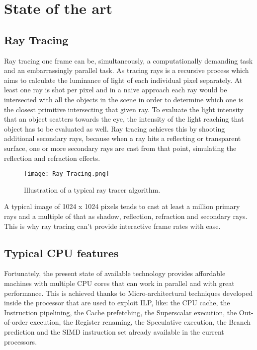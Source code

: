 \chapter{State of the art}

\section{Ray Tracing}

\par
Ray tracing one frame can be, simultaneously, a computationally demanding task and an embarrassingly parallel task.
As tracing rays is a recursive process which aims to calculate the luminance of light of each individual pixel separately.
At least one ray is shot per pixel and in a naive approach each ray would be intersected with all the objects in the scene in order to determine which one is the closest primitive intersecting that given ray.
To evaluate the light intensity that an object scatters towards the eye, the intensity of the light reaching that object has to be evaluated as well.
Ray tracing achieves this by shooting additional secondary rays, because when a ray hits a reflecting or transparent surface, one or more secondary rays are cast from that point, simulating the reflection and refraction effects.

\begin{figure}[H]
	\centering
	\caption{Illustration of a typical ray tracer algorithm.}
	\label{Illustration of a typical ray tracer algorithm.}
	\texttt{[image: Ray\_Tracing.png]}
\end{figure}

\par
A typical image of 1024 x 1024 pixels tends to cast at least a million primary rays and a multiple of that as shadow, reflection, refraction and secondary rays.
This is why ray tracing can't provide interactive frame rates with ease.

\section{Typical CPU features}

\par
Fortunately, the present state of available technology provides affordable machines with multiple CPU cores that can work in parallel and with great performance.
This is achieved thanks to Micro-architectural techniques developed inside the processor that are used to exploit ILP, like:
the CPU cache, the Instruction pipelining, the Cache prefetching, the Superscalar execution, the Out-of-order execution, the Register renaming, the Speculative execution, the Branch prediction and the SIMD instruction set already available in the current processors.

